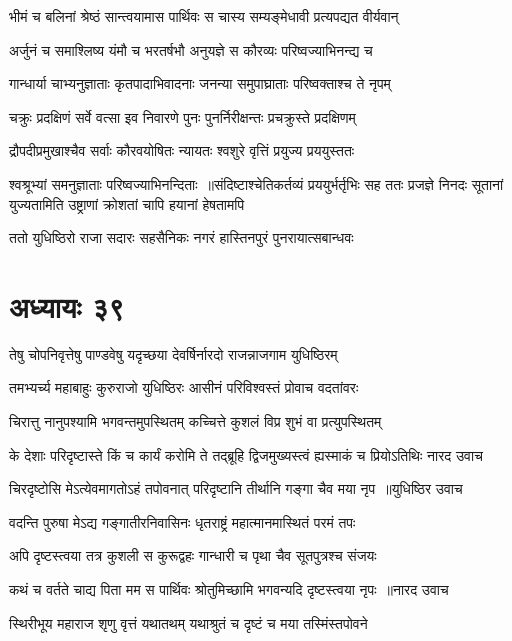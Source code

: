 \twolineshloka
{भीमं च बलिनां श्रेष्ठं सान्त्वयामास पार्थिवः}
{स चास्य सम्यङ्मेधावी प्रत्यपद्यत वीर्यवान्}


\twolineshloka
{अर्जुनं च समाश्लिष्य यंमौ च भरतर्षभौ}
{अनुयज्ञे स कौरव्यः परिष्वज्याभिनन्द्य च}


\twolineshloka
{गान्धार्या चाभ्यनुज्ञाताः कृतपादाभिवादनाः}
{जनन्या समुपाघ्राताः परिष्वक्ताश्च ते नृपम्}


\twolineshloka
{चक्रुः प्रदक्षिणं सर्वे वत्सा इव निवारणे}
{पुनः पुनर्निरीक्षन्तः प्रचक्रुस्ते प्रदक्षिणम्}


\twolineshloka
{द्रौपदीप्रमुखाश्चैव सर्वाः कौरवयोषितः}
{न्यायतः श्वशुरे वृत्तिं प्रयुज्य प्रययुस्ततः}


श्वश्रूभ्यां समनुज्ञाताः परिष्वज्याभिनन्दिताः ॥संदिष्टाश्चेतिकर्तव्यं प्रययुर्भर्तृभिः सह
\twolineshloka
{ततः प्रजज्ञे निनदः सूतानां युज्यतामिति}
{उष्ट्राणां क्रोशतां चापि हयानां हेषतामपि}


\twolineshloka
{ततो युधिष्ठिरो राजा सदारः सहसैनिकः}
{नगरं हास्तिनपुरं पुनरायात्सबान्धवः}


\chapter{अध्यायः ३९}
\twolineshloka
{तेषु चोपनिवृत्तेषु पाण्डवेषु यदृच्छया}
{देवर्षिर्नारदो राजन्नाजगाम युधिष्ठिरम्}


\twolineshloka
{तमभ्यर्च्य महाबाहुः कुरुराजो युधिष्ठिरः}
{आसीनं परिविश्वस्तं प्रोवाच वदतांवरः}


\twolineshloka
{चिरात्तु नानुपश्यामि भगवन्तमुपस्थितम्}
{कच्चित्ते कुशलं विप्र शुभं वा प्रत्युपस्थितम्}


\fourlineindentedshloka
{के देशाः परिदृष्टास्ते किं च कार्यं करोमि ते}
{तद्ब्रूहि द्विजमुख्यस्त्वं ह्यस्माकं च प्रियोऽतिथिः}
{नारद उवाच}
{}


\threelineshloka
{चिरदृष्टोसि मेऽत्येवमागतोऽहं तपोवनात्}
{परिदृष्टानि तीर्थानि गङ्गा चैव मया नृप ॥युधिष्ठिर उवाच}
{}


\twolineshloka
{वदन्ति पुरुषा मेऽद्य गङ्गातीरनिवासिनः}
{धृतराष्ट्रं महात्मानमास्थितं परमं तपः}


\twolineshloka
{अपि दृष्टस्त्वया तत्र कुशली स कुरूद्वहः}
{गान्धारी च पृथा चैव सूतपुत्रश्च संजयः}


\threelineshloka
{कथं च वर्तते चाद्य पिता मम स पार्थिवः}
{श्रोतुमिच्छामि भगवन्यदि दृष्टस्त्वया नृपः ॥नारद उवाच}
{}


\twolineshloka
{स्थिरीभूय महाराज शृणु वृत्तं यथातथम्}
{यथाश्रुतं च दृष्टं च मया तस्मिंस्तपोवने}


